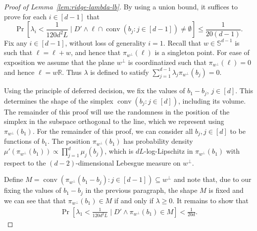 \documentclass{article}\usepackage[a4paper,margin=20mm]{geometry}
\newcommand{\R}{\mathbb R}
\newcommand{\conv}{\operatorname{conv}}
\renewcommand{\subset}{\subseteq}
\begin{document}
\begin{proof}[Proof of Lemma~\ref{lem:ridge-lambda-lb}]
    By using a union bound, it suffices to prove for each $i \in [d-1]$ that
    \[
    \Pr[\lambda_i < \frac{1}{120d^2 L} \mid D' \wedge \ell \cap \conv(b_j : j\in [d-1]) \neq \emptyset ] \leq \frac{1}{20(d-1)}.
    \]
    Fix any $i \in [d - 1]$, without loss of generality $i=1$.
    Recall that $w \in \mathbb{S}^{d-1}$ is such that $\ell = \ell+w$, and hence that $\pi_{w^\perp}(\ell)$ is a singleton point.
    For ease of exposition we assume that the plane $w^\perp$ is coordinatized such that $\pi_{w^\perp}(\ell) = 0$
    and hence $\ell = w\R$.
    Thus $\lambda$ is defined to satisfy $\sum_{j=1}^{d-1} \lambda_j \pi_{w^\perp}(b_j) = 0$.

    Using the principle of deferred decision, we fix the values of $b_1 - b_j$, $j \in [d]$.
    This determines the shape of the simplex $\conv(b_j : j \in [d])$, including its volume.
    The remainder of this proof will use the randomness in the position of the simplex
    in the subspace orthogonal to the line, which we represent using $\pi_{w^\perp}(b_1)$.
    For the remainder of this proof, we can consider all $b_j, j \in [d]$
    to be functions of $b_1$.
    The position $\pi_{w^\perp}(b_1)$ has
    probability density $\mu'(\pi_{w^\perp}(b_1)) \propto \prod_{j=1}^d \mu_j(b_j)$, which is
    $dL$-log-Lipschitz in $\pi_{w^\perp}(b_1)$ with respect to the $(d-2)$-dimensional Lebesgue
    measure on $w^\perp$.

    Define $M = \conv(\pi_{w^\perp}(b_1 - b_j) : j \in [d-1]) \subset w^\perp$ and note that,
    due to our fixing the values of $b_1-b_j$ in the previous paragraph,
    the shape $M$ is fixed and we can see that
    that $\pi_{w^\perp}(b_1) \in M$ if and only if $\lambda \geq 0$.
    It remains to show that
    \begin{align}
        \Pr[\lambda_1 < \frac{1}{ 120d^2 L} \mid D' \wedge \pi_{w^\perp}(b_1) \in M] < \frac{1}{20d}. \label{eq:lambda-lb-goal}
    \end{align}


\end{proof}
\end{document}
